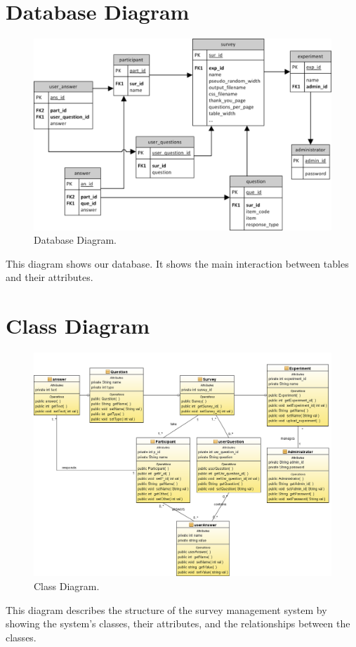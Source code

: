 \documentclass[a4paper,12pt,oneside]{report}
\begin{document}
\section{Database Diagram}
\vskip 2cm
\label{database}
\begin{figure}[h!]
  \begin{center}
   \includegraphics[width=15.5cm]{pics/class.png}
  \end{center}
\caption{Database Diagram.}
\end{figure}
\vskip 1cm
This diagram shows our database. It shows the main interaction between tables and their attributes.
\newpage
\section{Class Diagram}
\vskip 2cm
\begin{figure}[h!]
  \begin{center}
   \includegraphics[width=16cm]{pics/ClassD.png}
  \end{center}
\caption{Class Diagram.}
\end{figure}
\vskip 1cm
This diagram describes the structure of the survey management system by showing the system's classes, their attributes, and the relationships between the classes.
\newpage
\end{document}
